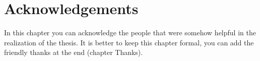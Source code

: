 \chapter{Acknowledgements}
In this chapter you can acknowledge the people that were somehow helpful in the realization of the thesis. It is better to keep this chapter formal, you can add the friendly thanks at the end (chapter Thanks).